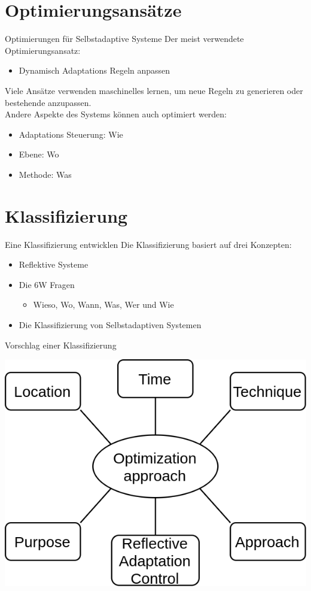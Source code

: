 \documentclass[de,16:9]{sdqbeamer}
\begin{document}
\section{Optimierungsansätze}

\begin{frame}{Optimierungen für Selbstadaptive Systeme}
	Der meist verwendete Optimierungsansatz:
	\begin{itemize}
		\item Dynamisch Adaptations Regeln anpassen
	\end{itemize}
	\medskip
	Viele Ansätze verwenden maschinelles lernen, um neue Regeln zu generieren
	oder bestehende anzupassen. \\
	\medskip
	Andere Aspekte des Systems können auch optimiert werden:
	\begin{itemize}
		\item Adaptations Steuerung: Wie
		\item Ebene: Wo
		\item Methode: Was
	\end{itemize}
\end{frame}

\section{Klassifizierung}

\begin{frame}{Eine Klassifizierung entwicklen}
	Die Klassifizierung basiert auf drei Konzepten:
	\begin{itemize}
		\item Reflektive Systeme \cite{FORMS}
		\item Die 6W Fragen \cite{LandscapeAndResearchChallenges}
		\begin{itemize}
			\item Wieso, Wo, Wann, Was, Wer und Wie
		\end{itemize}
		\item Die Klassifizierung von Selbstadaptiven Systemen \cite{SurveyOnEngineeringApproaches}
	\end{itemize}
\end{frame}

\begin{frame}{Vorschlag einer Klassifizierung}
	\begin{center}
		\includegraphics[width=.5\textwidth]{sources/ClassificationProposal-Proposal.png}
	\end{center}
\end{frame}
\end{document}
